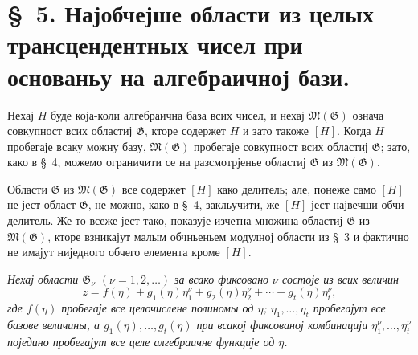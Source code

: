 ﻿\documentclass[11pt]{article}
\begin{document}
\section*{\S\ 5. Најобчејше области из целых трансцендентных чисел при основаньу на алгебраичној бази.}

Нехај $H$ буде која-коли алгебраична база всих чисел, и нехај
$\mathfrak M(\mathfrak G)$ означа совкупност всих областиј $\mathfrak G$, кторе
содержет $H$ и зато такоже $[H]$. Когда $H$ пробегаје всаку можну базу,
$\mathfrak M(\mathfrak G)$ пробегаје совкупност всих областиј $\mathfrak G$;
зато, како в \S\ 4, можемо ограничити се на разсмотрјенье областиј
$\mathfrak G$ из $\mathfrak M(\mathfrak G)$.

Области $\mathfrak G$ из $\mathfrak M(\mathfrak G)$ все содержет $[H]$ како
делитель; але, понеже само $[H]$ не јест област $\mathfrak G$, не можно, како в
\S\ 4, закльучити, же $[H]$ јест највечши обчи делитель. Же то всеже јест тако,
показује изчетна множина областиј $\mathfrak G$ из $\mathfrak M(\mathfrak G)$,
кторе взникајут малым обчньеньем модулној области из \S\ 3 и фактично не имајут
ниједного обчего елемента кроме $[H]$.

{\itshape Нехај области $\mathfrak G_\nu$ $(\nu=1,2,\ldots)$ за всако фиксовано
$\nu$ состоје из всих величин}
\begin{equation}
z=f(\eta)+g_1(\eta)\eta_1^\nu+g_2(\eta)\eta_2^\nu+\cdots+g_t(\eta)\eta_t^\nu,
\tag{1}
\end{equation}
{\itshape где $f(\eta)$ пробегаје все целочислене полиномы од $\eta$;
$\eta_1,\ldots,\eta_t$ пробегајут все базове величины, а
$g_1(\eta),\ldots,g_t(\eta)$ при всакој фиксованој комбинацији
$\eta_1^\nu,\ldots,\eta_t^\nu$ поједино пробегајут все целе алгебраичне функције
од $\eta$.}
\end{document}
